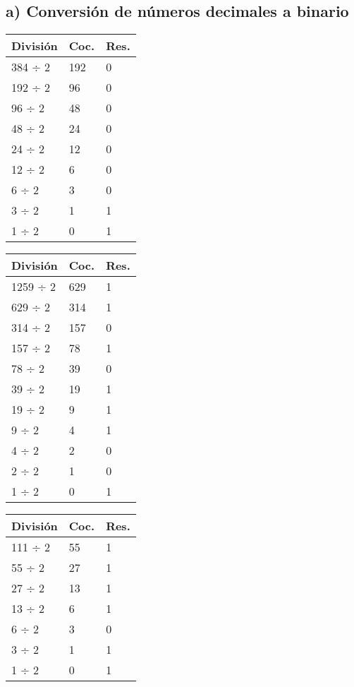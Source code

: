 \documentclass[12pt]{article}
\begin{document}
\subsection*{a) Conversión de números decimales a binario}
\begin{table}[H]
\centering
\begin{minipage}[t]{0.32\textwidth}
\centering
\begin{tabular}{lll}
\toprule
\textbf{División} & \textbf{Coc.} & \textbf{Res.} \\
\midrule
384 ÷ 2 & 192 & 0 \\
192 ÷ 2 & 96  & 0 \\
96 ÷ 2  & 48  & 0 \\
48 ÷ 2  & 24  & 0 \\
24 ÷ 2  & 12  & 0 \\
12 ÷ 2  & 6   & 0 \\
6 ÷ 2   & 3   & 0 \\
3 ÷ 2   & 1   & 1 \\
1 ÷ 2   & 0   & 1 \\
\bottomrule
\end{tabular}
\end{minipage}
\hfill
\begin{minipage}[t]{0.32\textwidth}
\centering
\begin{tabular}{lll}
\toprule
\textbf{División} & \textbf{Coc.} & \textbf{Res.} \\
\midrule
1259 ÷ 2 & 629 & 1 \\
629 ÷ 2  & 314 & 1 \\
314 ÷ 2  & 157 & 0 \\
157 ÷ 2  & 78  & 1 \\
78 ÷ 2   & 39  & 0 \\
39 ÷ 2   & 19  & 1 \\
19 ÷ 2   & 9   & 1 \\
9 ÷ 2    & 4   & 1 \\
4 ÷ 2    & 2   & 0 \\
2 ÷ 2    & 1   & 0 \\
1 ÷ 2    & 0   & 1 \\
\bottomrule
\end{tabular}
\end{minipage}
\hfill
\begin{minipage}[t]{0.32\textwidth}
\centering
\begin{tabular}{lll}
\toprule
\textbf{División} & \textbf{Coc.} & \textbf{Res.} \\
\midrule
111 ÷ 2 & 55 & 1 \\
55 ÷ 2  & 27 & 1 \\
27 ÷ 2  & 13 & 1 \\
13 ÷ 2  & 6  & 1 \\
6 ÷ 2   & 3  & 0 \\
3 ÷ 2   & 1  & 1 \\
1 ÷ 2   & 0  & 1 \\
\bottomrule
\end{tabular}
\end{minipage}
\end{table}
\end{document}
